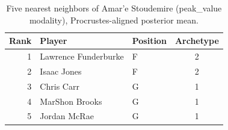 \begin{table}[htbp]
  \centering\small
  \begin{tabular}{rllc}
    \toprule
    Rank & Player & Position & Archetype \\
    \midrule
    1 & Lawrence Funderburke & F & 2 \\
    2 & Isaac Jones & F & 2 \\
    3 & Chris Carr & G & 1 \\
    4 & MarShon Brooks & G & 1 \\
    5 & Jordan McRae & G & 1 \\
    \bottomrule
  \end{tabular}
  \caption{Five nearest neighbors of Amar'e Stoudemire (peak_value modality), Procrustes-aligned posterior mean.}
  \label{tab:Amar_e_Stoudemire_neighbors_peak_value}
\end{table}

